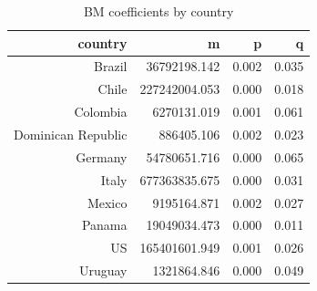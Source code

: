 \begin{table}[ht]
\centering
\begin{tabular}{rrrr}
  \toprule
country & m & p & q \\ 
  \midrule
Brazil & 36792198.142 & 0.002 & 0.035 \\ 
  Chile & 227242004.053 & 0.000 & 0.018 \\ 
  Colombia & 6270131.019 & 0.001 & 0.061 \\ 
  Dominican Republic & 886405.106 & 0.002 & 0.023 \\ 
  Germany & 54780651.716 & 0.000 & 0.065 \\ 
  Italy & 677363835.675 & 0.000 & 0.031 \\ 
  Mexico & 9195164.871 & 0.002 & 0.027 \\ 
  Panama & 19049034.473 & 0.000 & 0.011 \\ 
  US & 165401601.949 & 0.001 & 0.026 \\ 
  Uruguay & 1321864.846 & 0.000 & 0.049 \\ 
   \bottomrule
\end{tabular}
\caption{BM coefficients by country} 
\label{tab:bm_coefs}
\end{table}
